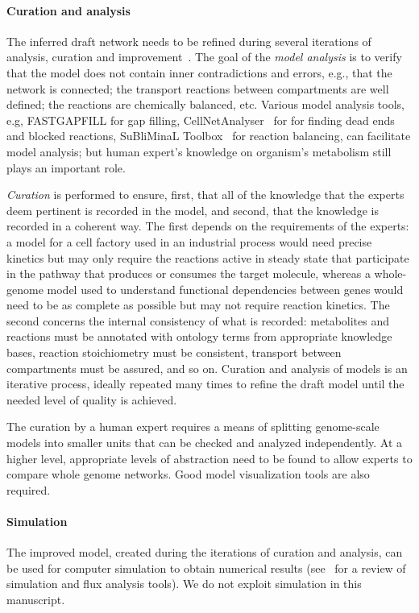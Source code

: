 \documentclass{bmcart}
\begin{document}
\paragraph{Curation and analysis}
The inferred draft network needs to be refined during several iterations of analysis, curation and improvement~\cite{Thiele2010,Swainston2011}. The goal of the \emph{model analysis} is to verify that the model does not contain inner contradictions and errors, e.g., that the network is connected; the transport reactions between compartments are well defined; the reactions are chemically balanced, etc. Various model analysis tools, e.g, FASTGAPFILL \cite{Thiele2014} for gap filling, CellNetAnalyser~\cite{Klamt07} for for finding dead ends and blocked reactions, SuBliMinaL Toolbox~\cite{Swainston2011} for reaction balancing, can facilitate model analysis; but human expert's knowledge on organism's metabolism still plays an important role.

\emph{Curation} is performed to ensure, first, that all of the knowledge that the experts
deem pertinent is recorded in the model, and second, that the knowledge is recorded in a
coherent way.
The first depends on the requirements of the experts: a model for a cell factory used in
an industrial process would need precise kinetics but may only require the reactions
active in steady state that participate in the pathway that produces or consumes the
target molecule, whereas a whole-genome model used to understand functional dependencies
between genes would need to be as complete as possible but may not require reaction kinetics.
The second concerns the internal consistency of what is recorded: metabolites and
reactions must be annotated with ontology terms from appropriate knowledge bases, 
reaction stoichiometry must be consistent, transport between compartments must be assured,
and so on.
Curation and analysis of models is an iterative process, ideally repeated many times to
refine the draft model until the needed level of quality is achieved.

The curation by a human expert requires a means of splitting genome-scale models into smaller units that can be checked and analyzed independently. At a higher level, appropriate levels of abstraction need to be found to allow experts to compare whole genome networks. Good model visualization tools are also required.

\paragraph{Simulation}
The improved model, created during the iterations of curation and analysis, %
can be used for computer simulation to obtain numerical results (see~\cite{Copeland2012a} for a review of simulation and flux analysis tools). We do not exploit simulation in this manuscript.
\end{document}
